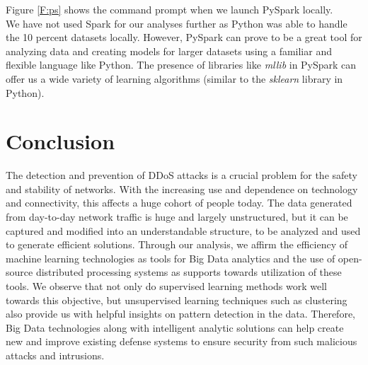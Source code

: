 Figure \ref{F:ps} shows the command prompt when we launch PySpark locally.\\
We have not used Spark for our analyses further as Python was able to handle the 10 percent datasets locally. However, PySpark can prove to be a great tool for analyzing data and creating models for larger datasets using a familiar and flexible language like Python. The presence of libraries like {\em mllib} in PySpark can offer us a wide variety of learning algorithms (similar to the {\em sklearn} library in Python).

\section{Conclusion}
The detection and prevention of DDoS attacks is a crucial problem for the safety and stability of networks. With the increasing use and dependence on technology and connectivity, this affects a huge cohort of people today. The data generated from day-to-day network traffic is huge and largely unstructured, but it can be captured and modified into an understandable structure, to be analyzed and used to generate efficient solutions. Through our analysis, we affirm the efficiency of machine learning technologies as tools for Big Data analytics and the use of open-source distributed processing systems as supports towards utilization of these tools. We observe that not only do supervised learning methods work well towards this objective, but unsupervised learning techniques such as clustering also provide us with helpful insights on pattern detection in the data. Therefore, Big Data technologies along with intelligent analytic solutions can help create new and improve existing defense systems to ensure security from such malicious attacks and intrusions.





